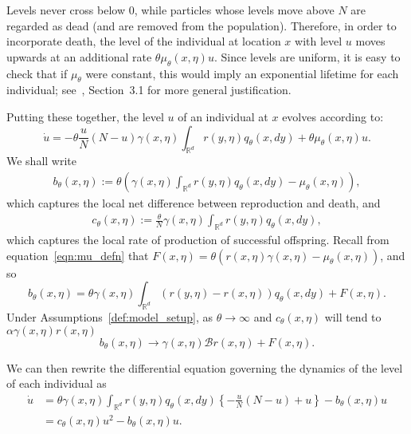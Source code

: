 \documentclass[12pt]{article}
\newcommand{\IR}{\mathbb R}
\newcommand{\DG}{\mathcal{B}}  %
\numberwithin{equation}{section}
\begin{document}
Levels never cross below 0,
while particles whose levels move above $N$ are regarded as dead
(and are removed from the population).
Therefore, in order to incorporate death,
the level of the individual at location $x$ with level $u$
moves upwards at an additional rate $\theta\mu_\theta(x,\eta) u$.
Since levels are uniform,
it is easy to check that if $\mu_\theta$ were constant,
this would imply an exponential lifetime for each individual;
see~\cite{etheridge/kurtz:2019}, Section~3.1
for more general justification.

Putting these together,
the level $u$ of an individual at $x$ evolves according to:
\begin{equation} \label{eqn:dot_u}
    \dot u
    =
    - \theta\frac{u}{N} \left(N - u\right)
    \gamma(x, \eta) \int_{\IR^d} r(y, \eta) q_\theta(x, dy) 
    +
    \theta\mu_\theta(x,\eta) u .
\end{equation}
We shall write 
\begin{align*}
    b_\theta(x, \eta)
    :=
    \theta\left(
    \gamma(x,\eta) \int_{\IR^d} r(y, \eta) q_\theta(x, dy)
    -
    \mu_\theta(x,\eta)
    \right) ,
\end{align*}
which captures the local net difference between reproduction and death,
and
\begin{align} \label{c_defn}
    c_\theta(x, \eta)
    :=
    \frac{\theta}{N} \gamma(x, \eta) \int_{\IR^d} r(y, \eta) q_\theta(x, dy) ,
\end{align}
which captures the local rate of production of successful offspring.
Recall from equation~\eqref{eqn:mu_defn} that
$F(x,\eta) = \theta(r(x,\eta)\gamma(x,\eta) - \mu_\theta(x,\eta))$,
and so 
\begin{equation}  \label{b_defn}
b_\theta(x, \eta)
=    \theta \gamma(x, \eta) \int_{\IR^d} \left( r(y, \eta) - r(x, \eta) \right) 
	q_\theta(x, dy)
    + F(x, \eta). 
\end{equation}
Under Assumptions~\ref{def:model_setup}, as $\theta \to \infty$ and
$c_\theta(x, \eta)$ will tend to $\alpha \gamma(x, \eta) r(x, \eta)$
\begin{equation}
\label{eqn:b_limit}
    b_\theta(x, \eta) \to \gamma(x, \eta) \DG r(x, \eta) + F(x, \eta) .
\end{equation}

We can then rewrite the differential equation 
governing the dynamics of the level of each individual as
\begin{align}
\dot{u}
    &=
    \theta\gamma(x,\eta) \int_{\IR^d} r(y, \eta) q_\theta(x, dy)
    \left\{
        -\frac{u}{N}\left(N - u\right)
        + u
    \right\}
    -
	b_\theta(x,\eta) u
    \nonumber \\
    &=
    c_\theta(x, \eta) u^2
    -
	b_\theta(x, \eta) u
    . \label{differential equation for level}
\end{align}
\end{document}
